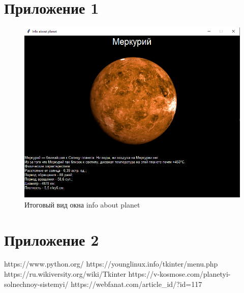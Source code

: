 \documentclass[11pt,a4paper]{report}
\begin{document}
\newpage
\section{Приложение 1}


\begin{figure}[h]
\centering
\includegraphics[width=1.0\linewidth]{1.png}
\caption{Итоговый вид окна info about planet}
\label{fig:mpr}
\end{figure}


\section{Приложение 2}


\begin{thebibliography}{5}
https://www.python.org/
https://younglinux.info/tkinter/menu.php
https://ru.wikiversity.org/wiki/Tkinter
https://v-kosmose.com/planetyi-solnechnoy-sistemyi/
https://webfanat.com/article\_id/?id=117
\end{thebibliography}
\end{document}

